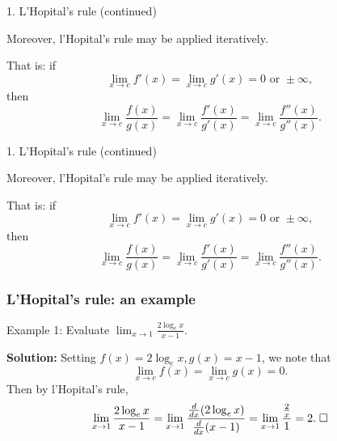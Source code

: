 \documentclass{beamer}
\begin{document}

\begin{frame}{1. L'Hopital's rule (continued)}

Moreover, l'Hopital's rule may be applied iteratively.

	\begin{block}{That is:}
if	
\[
\lim_{x\rightarrow c} f'(x) = \lim_{x\rightarrow c} g'(x) = 0 \text{ or } \pm \infty ,
\]
then
\[
\lim_{x\rightarrow c} \frac{f(x)}{g(x)} = \lim_{x\rightarrow c} \frac{f'(x)}{g'(x)} = \lim_{x\rightarrow c} \frac{f''(x)}{g''(x)}.
\]
	
	\end{block}	

\end{frame}


\begin{frame}{1. L'Hopital's rule (continued)}

Moreover, l'Hopital's rule may be applied iteratively.

	\begin{block}{That is:}
if	
\[
\lim_{x\rightarrow c} f'(x) = \lim_{x\rightarrow c} g'(x) = 0 \text{ or } \pm \infty ,
\]
then
\[
\lim_{x\rightarrow c} \frac{f(x)}{g(x)} = \lim_{x\rightarrow c} \frac{f'(x)}{g'(x)} = \lim_{x\rightarrow c} \frac{f''(x)}{g''(x)}.
\]
	
	\end{block}	

\end{frame}


\begin{frame}
\frametitle{L'Hopital's rule: an example}
			
			\begin{block}{Example 1:}
			Evaluate $\displaystyle{ \lim_{x\rightarrow 1} \frac{ 2\log_e x }{x-1}}$.
			\end{block}

{\bf Solution:} Setting $f(x) = 2 \log_e x, g(x) = x-1$, we note that 
\[
\lim_{x\rightarrow c} f(x) = \lim_{x\rightarrow c} g(x) = 0.
\]
Then by l'Hopital's rule,
\[
\lim_{x\rightarrow 1} \frac{2 \log_e x}{x-1} = \lim_{x\rightarrow 1} \frac{ \frac{d}{dx} (2 \log_e x)}{ \frac{d}{dx} (x-1)} = \lim_{x\rightarrow 1} \frac{\frac{2}{x}}{1} = 2. \thickspace \Box
\]

\end{frame}
\end{document}

